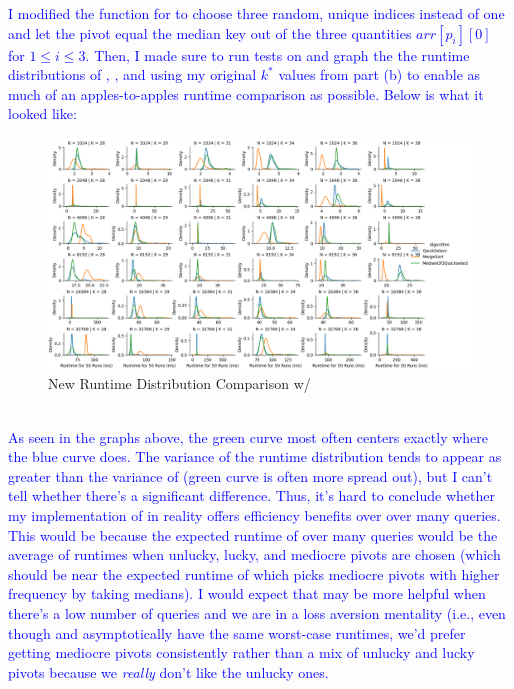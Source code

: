 \documentclass[11pt]{article}
\begin{document}
\begin{enumerate}
\begin{enumerate}
        \textcolor{blue}{
        I modified the function for \QuickSelect{} to choose three random, unique indices instead of one and let the pivot equal the median key out of the three quantities $arr[p_i][0]$ for $1 \leq i \leq 3$. Then, I made sure to run tests on \MedianQuickSelect{} and graph the the runtime distributions of \QuickSelect{}, \MedianQuickSelect{}, and \MergeSortSelect{} using my original $k^*$ values from part (b) to enable as much of an apples-to-apples runtime comparison as possible. Below is what it looked like:
        }

        \begin{figure}[H]
            \centering
            \includegraphics[width=1.1\linewidth]{medof3.png}
            \caption{New Runtime Distribution Comparison w/ \MedianQuickSelect{} }
            \label{fig:enter-label}
        \end{figure} \\

         \textcolor{blue}{
        As seen in the graphs above, the green curve most often centers exactly where the blue curve does. The variance of the \MedianQuickSelect{} runtime distribution tends to appear as greater than the variance of \QuickSelect{} (green curve is often more spread out), but I can't tell whether there's a significant difference. Thus, it's hard to conclude whether my implementation of \MedianQuickSelect{} in reality offers efficiency benefits over \QuickSelect{} over many queries. This would be because the expected runtime of \QuickSelect{} over many queries would be the average of runtimes when unlucky, lucky, and mediocre pivots are chosen (which should be near the expected runtime of \MedianQuickSelect{} which picks mediocre pivots with higher frequency by taking medians). I would expect that \MedianQuickSelect{} may be more helpful when there's a low number of queries and we are in a loss aversion mentality (i.e., even though \QuickSelect{} and \MedianQuickSelect{} asymptotically have the same worst-case runtimes, we'd prefer getting mediocre pivots consistently rather than a mix of unlucky and lucky pivots because we \textit{really} don't like the unlucky ones.
        } \\


\end{enumerate}
\end{enumerate}
\end{document}
